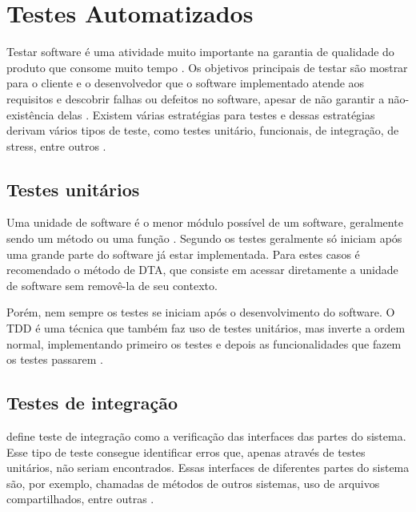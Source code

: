 \section{Testes Automatizados}

Testar software é uma atividade muito importante na garantia de qualidade do produto que consome muito tempo \cite{testing-is-hard}. Os objetivos principais de testar são mostrar para o cliente e o desenvolvedor que o software implementado atende aos requisitos e descobrir falhas ou defeitos no software, apesar de não garantir a não-existência delas \cite{sommerville}. Existem várias estratégias para testes e dessas estratégias derivam vários tipos de teste, como testes unitário, funcionais, de integração, de stress, entre outros \cite{art-of-testing}.

\subsection{Testes unitários}

Uma unidade de software é o menor módulo possível de um software, geralmente sendo um método ou uma função \cite{runeson}. Segundo  os testes geralmente só iniciam após uma grande parte do software já estar implementada. Para estes casos é recomendado o método de DTA, que consiste em acessar diretamente a unidade de software sem removê-la de seu contexto.

Porém, nem sempre os testes se iniciam após o desenvolvimento do software. O TDD é uma técnica que também faz uso de testes unitários, mas inverte a ordem normal, implementando primeiro os testes e depois as funcionalidades que fazem os testes passarem \cite{tdd}.

\subsection{Testes de integração}

 define teste de integração como a verificação das interfaces das partes do sistema. Esse tipo de teste consegue identificar erros que, apenas através de testes unitários, não seriam encontrados. Essas interfaces de diferentes partes do sistema são, por exemplo, chamadas de métodos de outros sistemas, uso de arquivos compartilhados, entre outras \cite{spillner}.


